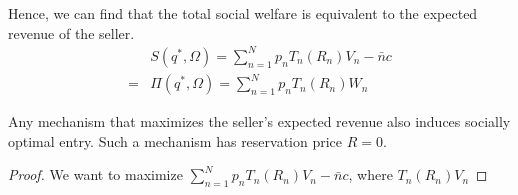 \documentclass[11pt]{elegantbook}
\begin{document}
Hence, we can find that the total social welfare is equivalent to the expected revenue of the seller.
\begin{equation}
    \begin{aligned}
        &S(q^*,\Omega)=\sum_{n=1}^N p_n T_n(R_n)V_n-\bar{n}c\\
        =&\Pi(q^*,\Omega)=\sum_{n=1}^N p_n T_n(R_n)W_n
    \end{aligned}
    \nonumber
\end{equation}


\begin{proposition}
    Any mechanism that maximizes the seller's expected revenue also induces socially optimal entry. Such a mechanism has reservation price $R=0$.
\end{proposition}
\begin{proof}
    We want to maximize $\sum_{n=1}^N p_n T_n(R_n)V_n-\bar{n}c$, where $T_n(R_n)V_n$
\end{proof}
\end{document}
